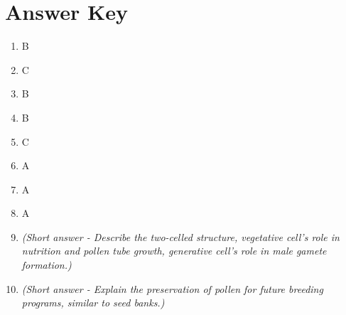 \documentclass{article}
\begin{document}
\section*{Answer Key}
\begin{enumerate}
    \item B
    \item C
    \item B
    \item B
    \item C
    \item A
    \item A
    \item A
    \item \textit{(Short answer - Describe the two-celled structure, vegetative cell's role in nutrition and pollen tube growth, generative cell's role in male gamete formation.)}
    \item \textit{(Short answer - Explain the preservation of pollen for future breeding programs, similar to seed banks.)}
\end{enumerate}
\end{document}
